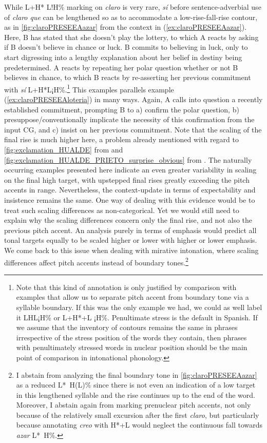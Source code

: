 While L+H* L!H\% marking on \textit{claro} is very rare, \textit{sí} before sentence-adverbial use of \textit{claro que} can be lengthened so as to accommodate a low-rise-fall-rise contour, as in \autoref{fig:claroPRESEEAazar} from the context in (\ref{ex:claroPRESEEAazar}). Here, B has stated that she doesn't play the lottery, to which A reacts by asking if B doesn't believe in chance or luck. B commits to believing in luck, only to start digressing into a lengthy explanation about her belief in destiny being predetermined. A reacts by repeating her polar question whether or not B believes in chance, to which B reacts by re-asserting her previous commitment with \textit{sí} L+H*L¡H\%.\footnote{Note that this kind of annotation is only justified by comparison with examples that allow us to separate pitch accent from boundary tone via a syllable boundary. If this was the only example we had, we could as well label it LHL¡H\% or L+H*+L ¡H\%. Penultimate stress is the default in Spanish. If we assume that the inventory of contours remains the same in phrases irrespective of the stress position of the words they contain, then phrases with penultimately stressed words in nuclear position should be the main point of comparison in intonational phonology.} This examples parallels example (\ref{ex:claroPRESEEAloteria}) in many ways. Again, A calls into question a recently established commitment, prompting B to a) confirm the polar question, b) presuppose/conventionally implicate the necessity of this confirmation from the input \ac{CG}, and c) insist on her previous commitment.\largerpage{} Note that the scaling of the final rise is much higher here, a problem already mentioned with regard to \autoref{fig:exclamation_HUALDE} from \citet[278]{Hualde.2014} and \autoref{fig:exclamation_HUALDE_PRIETO_surprise_obvious} from \citet[379]{HualdePrieto2015}. The naturally occurring examples presented here indicate an even greater variability in scaling on the final high target, with upstepped final rises greatly exceeding the pitch accents in range. Nevertheless, the context-update in terms of expectability and insistence remains the same. One way of dealing with this evidence would be to treat such scaling differences as non-categorical. Yet we would still need to explain why the scaling differences concern only the final rise, and not also the previous pitch accent. An analysis purely in terms of emphasis would predict all tonal targets equally to be scaled higher or lower with higher or lower emphasis. We come back to this issue when dealing with mirative intonation, where scaling differences affect pitch accents instead of boundary tones.{\footnote{I abstain from analyzing the final boundary tone in \autoref{fig:claroPRESEEAazar} as a reduced L*~H(L)\% since there is not even an indication of a low target in this lengthened syllable and the rise continues up to the end of the word. Moreover, I abstain again from marking prenuclear pitch accents, not only because of the relatively small excursion after the first \textit{claro}, but particularly because annotating \textit{creo} with H*+L would neglect the continuous fall towards \textit{azar} L*~H\%.}}

